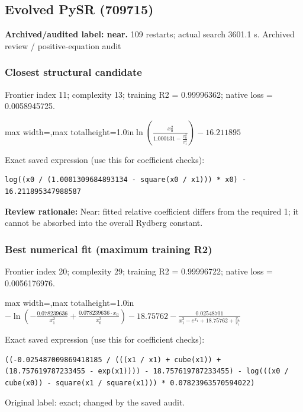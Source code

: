 \documentclass[10pt,letterpaper,landscape]{article}
\begin{document}
\begin{minipage}[t]{0.485\textwidth}
\subsection*{Evolved PySR (709715)}
\textbf{Archived/audited label: near.} 109 restarts; actual search 3601.1 s.
{\small Archived review / positive-equation audit}
\subsubsection*{Closest structural candidate}
Frontier index 11; complexity 13; training R2 = 0.99996362; native loss = 0.0058945725.
\begin{center}\begin{adjustbox}{max width=\linewidth,max totalheight=1.0in}$\displaystyle \ln{\left(\frac{x_{0}^{2}}{1.000131 - \frac{x_{0}^{2}}{x_{1}^{2}}} \right)} - 16.211895$\end{adjustbox}\end{center}
{\scriptsize Exact saved expression (use this for coefficient checks):}
\begin{lstlisting}
log((x0 / (1.0001309684893134 - square(x0 / x1))) * x0) - 16.211895347988587
\end{lstlisting}
{\small\textbf{Review rationale:} Near: fitted relative coefficient differs from the required 1; it cannot be absorbed into the overall Rydberg constant.}
\subsubsection*{Best numerical fit (maximum training R2)}
Frontier index 20; complexity 29; training R2 = 0.99996722; native loss = 0.0056176976.
\begin{center}\begin{adjustbox}{max width=\linewidth,max totalheight=1.0in}$\displaystyle - \ln{\left(- \frac{0.078239636}{x_{1}^{2}} + \frac{0.078239636 \cdot x_{0}}{x_{0}^{3}} \right)} - 18.75762 - \frac{0.02548701}{x_{1}^{3} - e^{x_{1}} + 18.75762 + \frac{x_{1}}{x_{1}}}$\end{adjustbox}\end{center}
{\scriptsize Exact saved expression (use this for coefficient checks):}
\begin{lstlisting}
((-0.025487009869418185 / (((x1 / x1) + cube(x1)) + (18.757619787233455 - exp(x1)))) - 18.757619787233455) - log(((x0 / cube(x0)) - square(x1 / square(x1))) * 0.07823963570594022)
\end{lstlisting}
{\small Original label: exact; changed by the saved audit.}
\end{minipage}
\clearpage{}\label{rydberg-10005}
\end{document}
